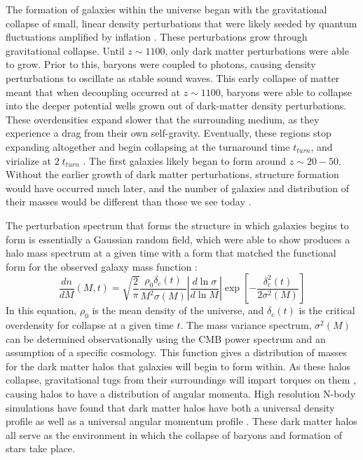 The formation of galaxies within the universe began with the gravitational
collapse of small, linear density perturbations that were likely seeded by
quantum fluctuations amplified by inflation \citep{Guth1981,Linde1982}.  These
perturbations grow through gravitational collapse.  Until $z\sim1100$, only dark
matter perturbations were able to grow.  Prior to this, baryons were coupled to
photons, causing density perturbations to oscillate as stable sound waves.  This
early collapse of matter meant that when decoupling occurred at $z\sim1100$,
baryons were able to collapse into the deeper potential wells grown out of
dark-matter density perturbations.  These overdensities expand slower that the
surrounding medium, as they experience a drag from their own self-gravity.
Eventually, these regions stop expanding altogether and begin collapsing at the
turnaround time $t_{turn}$, and virialize at $2\;t_{turn}$ \citep{Peebles1980}.
The first galaxies likely began to form around $z\sim20-50$.  Without the
earlier growth of dark matter perturbations, structure formation would have
occurred much later, and the number of galaxies and distribution of their masses
would be different than those we see today \citep{Davis1985}.

The perturbation spectrum that forms the structure in which galaxies begins to
form is essentially a Gaussian random field, which \citet{Press1974} were able
to show produces a halo mass spectrum at a given time with a form that matched
the functional form for the observed galaxy mass function
\citet{Schechter1976}:
\begin{equation}
    \frac{dn}{dM}(M,t) =
    \sqrt{\frac{2}{\pi}}\frac{\rho_0\delta_c(t)}{M^2\sigma(M)} 
    \left\lvert\frac{d\ln{\sigma}}{d\ln{M}}\right\rvert
    \exp{\left[-\frac{\delta^2_c(t)}{2\sigma^2(M)}\right]}
\end{equation}
In this equation, $\rho_0$ is the mean density of the universe, and
$\delta_c(t)$ is the critical overdensity for collapse at a given time $t$.
The mass variance spectrum, $\sigma^2(M)$ can be determined observationally
using the CMB power spectrum \citep{Fixsen1996,Spergel2003,Planck2015} and an
assumption of a specific cosmology.  This function gives a distribution of
masses for the dark matter halos that galaxies will begin to form within.  As
these halos collapse, gravitational tugs from their surroundings will impart
torques on them \citep{Barnes1987}, causing halos to have a distribution of
angular momenta.  High resolution N-body simulations have found that dark
matter halos have both a universal density profile
\citep{Navarro1996,Merritt2006} as well as a universal angular momentum profile
\citep{Bullock2001}.  These dark matter halos all serve as the environment in
which the collapse of baryons and formation of stars take place.

